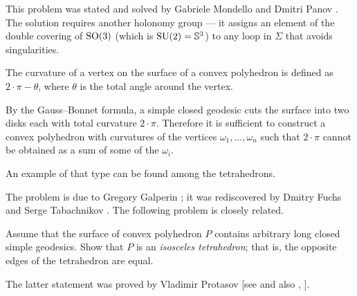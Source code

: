 This problem was stated and solved by Gabriele Mondello and Dmitri Panov \cite{mondello-panov}.
The solution requires another holonomy group ---
it assigns an element of the double covering of $\mathrm{SO}(3)$ (which is $\SU(2)\z=\mathbb{S}^3$) to any loop in $\Sigma$ that avoids singularities.


The curvature of a vertex on the surface of a convex polyhedron
is defined as $2\cdot\pi-\theta$, where $\theta$ is the total angle around the vertex.

By the Gauss--Bonnet formula, a simple closed geodesic cuts the surface into two disks each with total curvature $2\cdot\pi$.
Therefore it is sufficient to construct a convex polyhedron with curvatures of the vertices $\omega_1,\dots,\omega_n$ such that
$2\cdot\pi$ cannot be obtained as a sum of some of the $\omega_i$.

An example of that type can be found among the tetrahedrons.
\qeds

The problem is due to Gregory Galperin \cite{galperin};
it was rediscovered by Dmitry Fuchs and Serge Tabachnikov \cite[see 20.8 in][]{fuchs-tabachnikov}.
The following problem is closely related.

\begin{pr}
Assume that the surface of convex polyhedron $P$ contains arbitrary long closed simple geodesics. 
Show that $P$ is an \emph{isosceles tetrahedron};
that is, the opposite edges of the tetrahedron are equal.
\end{pr}

The latter statement was proved by Vladimir Protasov [see  and also , ].

